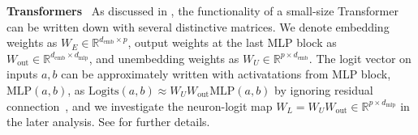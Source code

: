\documentclass[10pt]{article} %
\begin{document}
\textbf{Transformers}~
As discussed in \citet{elhage2021mathematical}, the functionality of a small-size Transformer can be written down with several distinctive matrices.
We denote embedding weights as $W_{E} \in \mathbb{R}^{d_{\text{emb}}\times p}$, output weights at the last MLP block as $W_{\text{out}} \in \mathbb{R}^{d_{\text{emb}}\times d_{\text{mlp}}}$, and unembedding weights as $W_{U} \in \mathbb{R}^{p\times d_{\text{emb}}}$.
The logit vector on inputs $a,b$ can be approximately written with activatations from MLP block, $\text{MLP}(a,b)$, as $\text{Logits}(a,b) \approx W_{U}W_{\text{out}}\text{MLP}(a,b)$ by ignoring residual connection~\citep{nanda2023progress}, and we investigate the neuron-logit map $W_{L} = W_{U}W_{\text{out}} \in \mathbb{R}^{p\times d_{\text{mlp}}}$ in the later analysis.
See  for further details.
\end{document}
